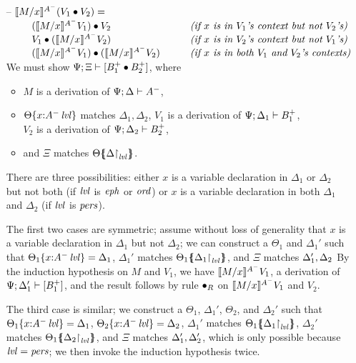 \begin{itemize}
\item[--] $\rsubsta{M}{x}{(\tfuser{V_1}{V_2})}{A^-} = $ \smallskip\\
    $\begin{array}{ll}
    \qquad \tfuser{(\rsubsta{M}{x}{V_1}{A^-})}{V_2}
     & \mbox{\it (if $x$ is in $V_1$'s context but not $V_2$'s)}\\
    \qquad \tfuser{V_1}{(\rsubsta{M}{x}{V_2}{A^-})}
     & \mbox{\it (if $x$ is in $V_2$'s context but not $V_1$'s)}\\
    \qquad \tfuser{(\rsubsta{M}{x}{V_1}{A^-})}{(\rsubsta{M}{x}{V_2}{A^-})}
     \qquad & \mbox{\it (if $x$ is in both $V_1$ and $V_2$'s contexts)}
    \end{array}$\smallskip\\
  We must show $\foc{\Psi}{\Xi}{[B_1^+ \fuse B_2^+]}$, where 
  \begin{itemize}
  \item $M$ is a derivation of $\foc{\Psi}{\Delta}{A^-}$, 
  \item $\tackon{\Theta}{x{:}\islvl{A^-}}$ matches $\Delta_1, \Delta_2$,
     $V_1$ is a derivation of $\foc{\Psi}{\Delta_1}{B_1^+}$, \\
     $V_2$ is a derivation of $\foc{\Psi}{\Delta_2}{B_2^+}$, 
  \item and $\Xi$ matches $\frameoff{\Theta}{\restrictto{\Delta}{\mlvl}}$.
  \end{itemize}
  There are three possibilities: either $x$ is a variable declaration
  in $\Delta_1$ or $\Delta_2$ but not both (if $\mlvl$ is $\meph$ or
  $\mtrue$) or $x$ is a variable declaration in both $\Delta_1$ and
  $\Delta_2$ (if $\mlvl$ is $\mpers$).

  The first two cases are symmetric; 
  assume without loss of generality that $x$ is a variable declaration
  in $\Delta_1$ but not $\Delta_2$; we can construct a 
  $\Theta_1$ and $\Delta_1'$ 
  such that $\tackon{\Theta_1}{x{:}\islvl{A^-}} = \Delta_1$,
  $\Delta_1'$ matches $\frameoff{\Theta_1}{\restrictto{\Delta_1}{\mlvl}}$,
  and $\Xi$ matches $\matchconj{\Delta_1'}{\Delta_2}$
  By the induction hypothesis on $M$ and $V_1$, we have 
  $\rsubsta{M}{x}{V_1}{A^-}$, a derivation of 
  $\foc{\Psi}{\Delta_1'}{[B_1^+]}$, and the result follows by
  rule ${\fuse}_R$ on $\rsubsta{M}{x}{V_1}{A^-}$ and $V_2$.

  The third case is similar; we construct a 
  $\Theta_1$, $\Delta_1'$, $\Theta_2$, and $\Delta_2'$ such that 
  $\tackon{\Theta_1}{x{:}\islvl{A^-}} = \Delta_1$,
  $\tackon{\Theta_2}{x{:}\islvl{A^-}} = \Delta_2$,
  $\Delta_1'$ matches $\frameoff{\Theta_1}{\restrictto{\Delta_1}{\mlvl}}$,
  $\Delta_2'$ matches $\frameoff{\Theta_1}{\restrictto{\Delta_2}{\mlvl}}$,
  and $\Xi$ matches $\matchconj{\Delta_1'}{\Delta_2'}$, which is only 
  possible because $\mlvl = \mpers$; we then invoke the induction 
  hypothesis twice. 


\end{itemize}
